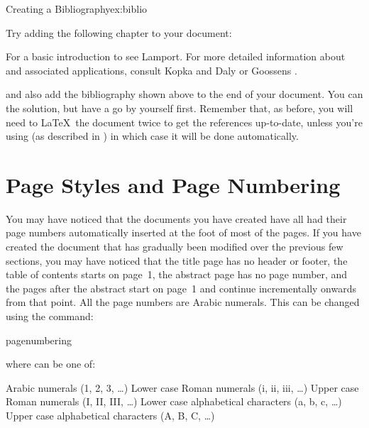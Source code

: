 \begin{exercise}{Creating a Bibliography}{ex:biblio}

Try adding the following chapter to your document:
\begin{code}

For a basic introduction to see
Lamport. For
more detailed information about and
associated applications, consult Kopka and
Daly or Goossens
.
\end{code}%
and also add the bibliography shown above to the end of your
document. You can  the solution, but have a
go by yourself first. Remember that, as before, you will need to
\LaTeX\ the document twice to get the references up-to-date, unless
you're using  (as described in
) in which case it will be done
automatically.

\end{exercise}


\section{Page Styles and Page Numbering}
\label{sec:pagestyle}

You may have noticed that the documents you have created
have all had their page numbers automatically inserted 
at the foot of most of the pages.  If you have created the document
that has gradually been modified over the previous few
sections, you may have noticed that the title page has
no header or footer, the table of contents starts on page~1,
the abstract page has no page number, and the pages after
the abstract start on page~1 and continue incrementally
onwards from that point.  All the page numbers are Arabic
numerals.  This can be changed using the command:
\begin{definition}
\gls{pagenumbering}
\end{definition}%
where  can be one of:
\begin{fwlist}{}
 Arabic numerals (1, 2, 3, \ldots)
 Lower case Roman numerals (i, ii, iii, \ldots)
 Upper case Roman numerals (I, II, III, \ldots)
 Lower case alphabetical characters (a, b, c, \ldots)
 Upper case alphabetical characters (A, B, C, \ldots)
\end{fwlist}

